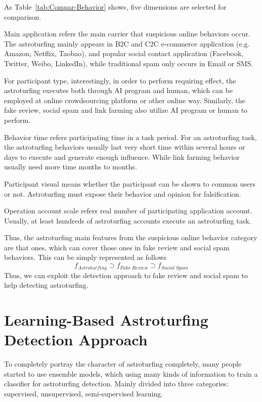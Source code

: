 \documentclass[lettersize,journal]{IEEEtran}
\begin{document}
As Table~\ref{tab:Compar-Behavior} shows, five dimensions are selected for comparison.

Main application refers the main carrier that suspicious online behaviors occur. The astroturfing mainly appears in B2C and C2C e-commerce application (e.g. Amazon, Netflix, Taobao), and popular social contact application (Facebook, Twitter, Weibo, LinkedIn), while traditional spam only occurs in Email or SMS.

For participant type, interestingly, in order to perform requiring effect, the astroturfing executes both through AI program and human, which can be employed at online crowdsourcing platform or other online way. Similarly, the fake review, social spam and link farming also utilize AI program or human to perform.

Behavior time refers participating time in a task period. For an astroturfing task, the astroturfing behaviors usually  last very short time within several hours or days to execute and  generate enough influence. While link farming behavior usually need more time months to months.

Participant visual means whether the participant can be shown to common users or not. Astroturfing must expose their behavior and opinion for falsification.

Operation account scale refers real number of participating application account. Usually, at least hundreds of astroturfing accounts execute an astroturfing task.

Thus, the astroturfing main features from the suspicious online behavior category are that ones, which can cover those ones in fake review and social spam behaviors. This can be simply represented as follows
\begin{equation}\label{featurecategory}
f_{Astroturfing}\supset f_{Fake~Review}\supset f_{Social~Spam}
\end{equation}
Thus, we can exploit the detection approach to fake review and social spam to help detecting astroturfing.




\section{Learning-Based Astroturfing Detection Approach}

To completely portray the character of astroturfing completely, many people started to use ensemble models, which using many kinds of information to train a classifier for astroturfing detection. Mainly divided into three categories: supervised, unsupervised, semi-supervised learning.
\end{document}
